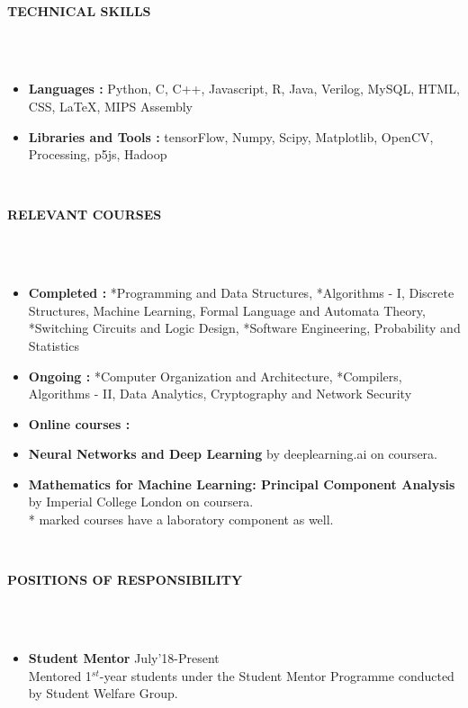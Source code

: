 \documentclass[letter,10pt]{book}
\newcommand{\lsep}{-0.5cm}
\newcommand{\resheading}[1]{{\small \colorbox{mygrey}{\begin{minipage}{0.975\textwidth}{\textbf{#1 \vphantom{p\^{E}}}}\end{minipage}}}}
\begin{document}
\hspace{0.5cm}\\[-0.2cm]
\resheading{\textbf{TECHNICAL SKILLS} }\\[\lsep]
\\[-1em]
\begin{itemize}
\item \textbf{Languages :} Python, C, C++, Javascript, R, Java, Verilog, MySQL, HTML, CSS, {\LaTeX{}}, MIPS Assembly
\\[-2em]
\item \textbf{Libraries and Tools :} tensorFlow, Numpy, Scipy, Matplotlib, OpenCV, Processing, p5js, Hadoop
\end{itemize}

\hspace{0.5cm}\\[-0.2cm]
\resheading{\textbf{RELEVANT COURSES} }\\[\lsep]
\\[-1em]
\begin{itemize}
\item \textbf{Completed : }*Programming and Data Structures, *Algorithms - I, Discrete Structures, Machine Learning, Formal Language and Automata Theory, *Switching Circuits and Logic Design, *Software Engineering, Probability and Statistics 
\\[-2em]
\item \textbf{Ongoing :} *Computer Organization and Architecture, *Compilers, Algorithms - II, Data Analytics, Cryptography and Network Security \\[-2em]
\item \textbf{Online courses :} \\[-2em]
\addtolength{\itemindent}{0.5cm}
\item  \textbf{Neural Networks and Deep Learning} by deeplearning.ai on coursera.\\[-2em]
\item  \textbf{Mathematics for Machine Learning: Principal Component Analysis} by Imperial College London on coursera.
\\
{*} marked courses have a laboratory component as well.
\end{itemize}

\hspace{0.5cm}\\[-0.2cm]
\resheading{\textbf{POSITIONS OF RESPONSIBILITY} }\\[\lsep]
\\[-1em]
\begin{itemize}
\item \large \textbf{Student Mentor} \hfill July'18-Present \normalsize\ \\ 
Mentored 1$^{st} $-year students under the Student Mentor Programme conducted by Student Welfare Group.
\end{itemize}
\end{document}
